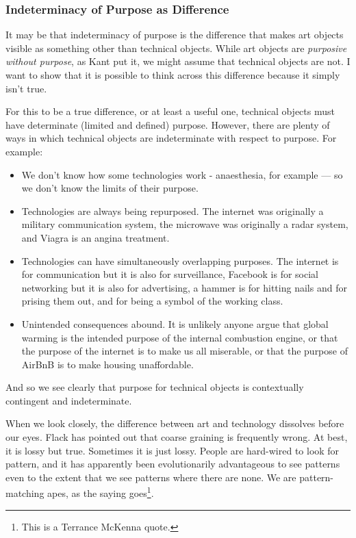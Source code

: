 \documentclass[letterpaper]{article}
\begin{document}
    \subsubsection{Indeterminacy of Purpose as Difference}

    It may be that indeterminacy of purpose is the difference that makes art objects visible as something other than technical objects. While art objects are \emph{purposive without purpose}, as Kant put it, we might assume that technical objects are not. I want to show that it is possible to think across this difference because it simply isn't true.

    For this to be a true difference, or at least a useful one, technical objects must have determinate (limited and defined) purpose. However, there are plenty of ways in which technical objects are indeterminate with respect to purpose. For example:

    \begin{itemize}
     
        \item We don't know how some technologies work - anaesthesia, for example — so we don't know the limits of their purpose.
    
        \item Technologies are always being repurposed. The internet was originally a military communication system, the microwave was originally a radar system, and Viagra is an angina treatment.

        \item Technologies can have simultaneously overlapping purposes. The internet is for communication but it is also for surveillance, Facebook is for social networking but it is also for advertising, a hammer is for hitting nails and for prising them out, and for being a symbol of the working class.

        \item Unintended consequences abound. It is unlikely anyone argue that global warming is the intended purpose of the internal combustion engine, or that the purpose of the internet is to make us all miserable, or that the purpose of AirBnB is to make housing unaffordable.
    \end{itemize}

    And so we see clearly that purpose for technical objects is contextually contingent and indeterminate.

    When we look closely, the difference between art and technology dissolves before our eyes. Flack has pointed out that coarse graining is frequently wrong. At best, it is lossy but true. Sometimes it is just lossy. People are hard-wired to look for pattern, and it has apparently been evolutionarily advantageous to see patterns even to the extent that we see patterns where there are none. We are pattern-matching apes, as the saying goes\footnote{
        This is a Terrance McKenna quote.
    }.
\end{document}

